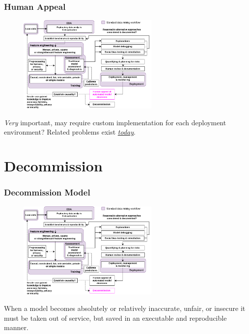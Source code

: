\documentclass[11pt,
               aspectratio=169,
               hyperref={colorlinks}
               ]{beamer}
\begin{document}
		\begin{frame}	
			\frametitle{Human Appeal}		
			
			\begin{figure}[htb]
				\begin{center}
					\includegraphics[height=135pt]{img/ha.png}
				\end{center}
			\end{figure}	

			\centering
			\footnotesize{\textit{Very} important, may require custom implementation for each deployment environment? Related problems exist \href{https://www.nytimes.com/2017/06/13/opinion/how-computers-are-harming-criminal-justice.html}{\textit{today}}}.

		\end{frame}
		
	\section{Decommission}

		\begin{frame}	
			\frametitle{Decommission Model}		
			
			\begin{figure}[htb]
				\begin{center}
					\includegraphics[height=135pt]{img/de.png}
				\end{center}
			\end{figure}	

			\centering
			\footnotesize{When a model becomes absolutely or relatively inaccurate, unfair, or insecure it must be taken out of service, but saved in an executable and reproducible manner.}

		\end{frame}
\end{document}
